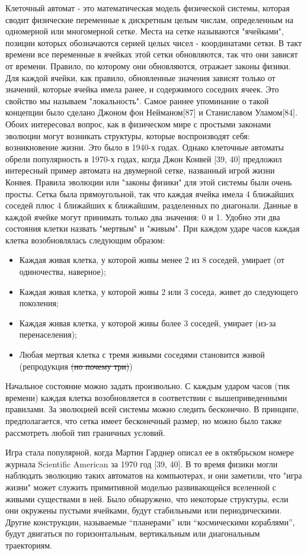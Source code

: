 \documentclass[main.tex]{subfiles}
\begin{document}
Клеточный автомат - это математическая модель физической системы, которая сводит физические переменные к дискретным целым числам, определенным на одномерной или многомерной сетке. Места на сетке называются "ячейками", позиции которых обозначаются серией целых чисел - координатами сетки. В такт времени все переменные в ячейках этой сетки обновляются, так что они зависят от времени. Правило, по которому они обновляются, отражает законы физики. Для каждой ячейки, как правило, обновленные значения зависят только от значений, которые ячейка имела ранее, и содержимого соседних ячеек. Это свойство мы называем "локальность". Самое раннее упоминание о такой концепции было сделано Джоном фон Нейманом[87] и Станиславом Уламом[84]. Обоих интересовал вопрос, как в физическом мире с простыми законами эволюции могут возникать структуры, которые воспроизводят себя: возникновение жизни. Это было в 1940-х годах. Однако клеточные автоматы обрели популярность в 1970-х годах, когда Джон Конвей [39, 40] предложил интересный пример автомата на двумерной сетке, названный игрой жизни Конвея. Правила эволюции или "законы физики" для этой системы были очень просты. Сетка была прямоугольной, так что каждая ячейка имела 4 ближайших соседей плюс 4 ближайших к ближайшим, разделенных по диагонали. Данные в каждой ячейке могут принимать только два значения: 0 и 1. Удобно эти два состояния клетки назвать "мертвым" и "живым". При каждом ударе часов каждая клетка возобновлялась следующим образом:

\begin{itemize}
\item Каждая живая клетка, у которой живы менее 2 из 8 соседей, умирает (от одиночества, наверное);
\item Каждая живая клетка, у которой живы 2 или 3 соседа, живет до следующего поколения;
\item Каждая живая клетка, у которой живы более 3 соседей, умирает (из-за перенаселения);
\item Любая мертвая клетка с тремя живыми соседями становится живой (репродукция \sout{(но почему три)})
\end{itemize} 

Начальное состояние можно задать произвольно. С каждым ударом часов (тик времени) каждая клетка возобновляется в соответствии с вышеприведенными правилами. За эволюцией всей системы можно следить бесконечно. В принципе, предполагается, что сетка имеет бесконечный размер, но можно было также рассмотреть любой тип граничных условий. 

Игра стала популярной, когда Мартин Гарднер описал ее в октябрьском номере журнала Scientific American за 1970 год [39, 40]. В то время физики могли наблюдать эволюцию таких автоматов на компьютерах, и они заметили, что "игра жизни" может служить примитивной моделью развивающейся вселенной с живыми существами в ней. Было обнаружено, что некоторые структуры, если они окружены пустыми ячейками, будут стабильными или периодическими. Другие конструкции, называемые ``планерами'' или ``космическими кораблями'', будут двигаться по горизонтальным, вертикальным или диагональным траекториям. 
\end{document}

